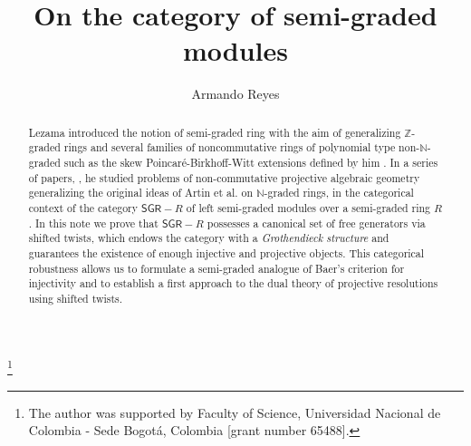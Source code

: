 \documentclass[reqno]{amsart}
\theoremstyle{definition}
\theoremstyle{remark}
\numberwithin{equation}{section}
\begin{document}
\title[On the category of semi-graded modules]{On the category of semi-graded modules}

\author{Armando Reyes}
\address{Universidad Nacional de Colombia - Sede Bogot\'a}

\thanks{The author was supported by Faculty of Science, Universidad Nacional de Colombia - Sede Bogot\'a, Colombia [grant number 65488].}



\date{}


\begin{abstract} 
Lezama \cite{LezamaLatorre2017} introduced the notion of semi-graded ring with the aim of generalizing $\mathbb{Z}$-graded rings and several families of noncommutative rings of polynomial type non-$\mathbb{N}$-graded such as the skew Poincar\'e-Birkhoff-Witt extensions defined by him \cite{GallegoLezama2010}. In a series of papers, \cite{Lezama2020, Lezama2021, LezamaGomez2019, LezamaLatorre2017}, 
he studied problems of non-commutative projective algebraic geometry generalizing the original ideas of Artin et al. \cite{Artin1992, ArtinSchelter1987, ArtinTateVandenBergh2007, ArtinTateVandenBergh1991, ArtinZhang1994} on $\mathbb{N}$-graded rings, in the categorical context of the category $\mathsf{SGR}-R$ of left semi-graded modules over a semi-graded ring $R$. In this note we prove that $\mathsf{SGR}-R$ possesses a canonical set of free generators via shifted twists, which endows the category with a {\em Grothendieck structure} and guarantees the existence of enough injective and projective objects. This categorical robustness allows us to formulate a semi-graded analogue of Baer's criterion for injectivity and to establish a first approach to the dual theory of projective resolutions using shifted twists. %
\end{abstract}
\end{document}
